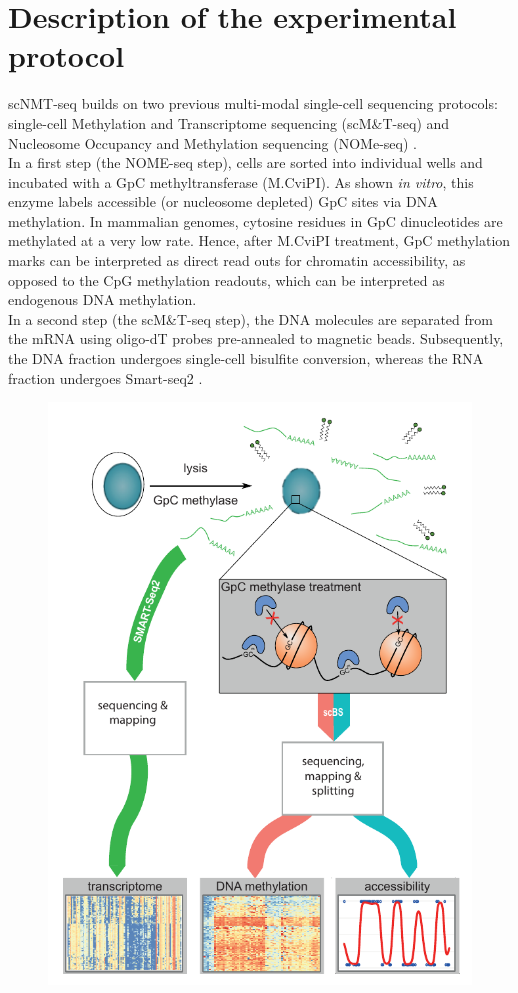 \section{Description of the experimental protocol}
scNMT-seq builds on two previous multi-modal single-cell sequencing protocols: single-cell Methylation and Transcriptome sequencing (scM\&T-seq) \cite{Angermueller2016} and Nucleosome Occupancy and Methylation sequencing (NOMe-seq) \cite{Kelly2012,Pott2016}.\\
In a first step (the NOME-seq step), cells are sorted into individual wells and incubated with a GpC methyltransferase (M.CviPI). As shown \textit{in vitro}, this enzyme labels accessible (or nucleosome depleted) GpC sites via DNA methylation\cite{Kilgore2007, Kelly2012}. In mammalian genomes, cytosine residues in GpC dinucleotides are methylated at a very low rate. Hence, after M.CviPI treatment, GpC methylation marks can be interpreted as direct read outs for chromatin accessibility, as opposed to the CpG methylation readouts, which can be interpreted as endogenous DNA methylation\cite{Kilgore2007, Kelly2012}.\\
In a second step (the scM\&T-seq step), the DNA molecules are separated from the mRNA using oligo-dT probes pre-annealed to magnetic beads. Subsequently, the DNA fraction undergoes single-cell bisulfite conversion\cite{Smallwood2014}, whereas the RNA fraction undergoes Smart-seq2 \cite{Picelli2014}.\\

\begin{figure}[H]
	\centering
	\includegraphics[width=0.6\linewidth]{scNMT_protocol}
	\caption[]{}
	\label{fig:scnmt_protocol}
\end{figure}

